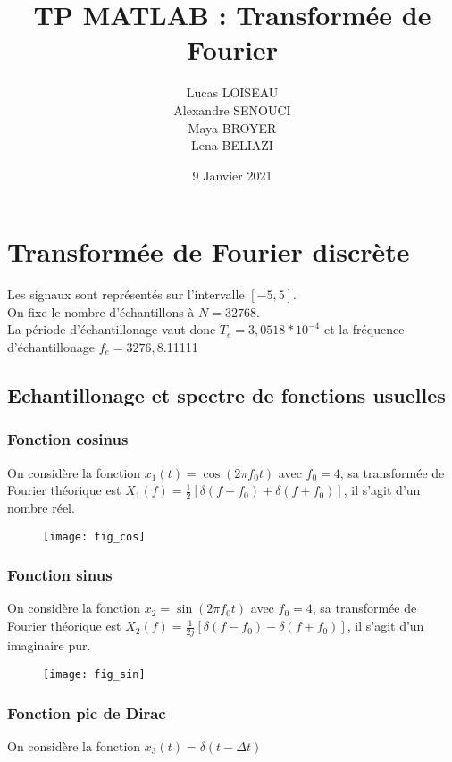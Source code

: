 \documentclass{article}
\title{TP MATLAB : Transformée de Fourier}
\date{9 Janvier 2021}
\author{Lucas LOISEAU \\ Alexandre SENOUCI \\ Maya BROYER \\ Lena BELIAZI}
\begin{document}
\maketitle
\section{Transformée de Fourier discrète}
Les signaux sont représentés sur l'intervalle $[-5,5]$. \\
On fixe le nombre d'échantillons à $N=32768$. \\
La période d'échantillonage vaut donc $T_e = 3,0518 * 10^{-4}$ et la fréquence d'échantillonage $f_e=3276,8$.11111
\subsection{Echantillonage et spectre de fonctions usuelles}
\subsubsection{Fonction cosinus}
On considère la fonction $x_1(t)=\cos(2\pi f_0 t)$ avec $f_0=4$, sa transformée de Fourier théorique est $X_1(f)=\frac{1}{2}[\delta(f-f_0)+\delta(f+f_0)]$, il s'agit d'un nombre réel.
\begin{figure}[h]
\texttt{[image: fig\_cos]}
\centering
\end{figure}

\subsubsection{Fonction sinus}
On considère la fonction $x_2=\sin(2\pi f_0 t)$ avec $f_0=4$, sa transformée de Fourier théorique est $X_2(f)=\frac{1}{2j}[\delta(f-f_0)-\delta(f+f_0)]$, il s'agit d'un imaginaire pur.
\begin{figure}[h]
\texttt{[image: fig\_sin]}
\centering
\end{figure}

\subsubsection{Fonction pic de Dirac}
On considère la fonction $x_3(t)=\delta(t-\Delta t)$
\end{document}
